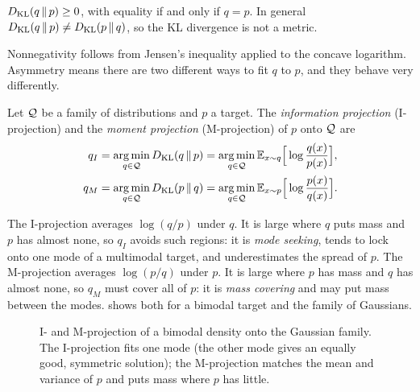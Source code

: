 \begin{proposition}\label{prop:kl-properties}
$D_{\mathrm{KL}}(q\,\|\,p)\ge0$, with equality if and only if $q=p$. In general $D_{\mathrm{KL}}(q\,\|\,p)\ne D_{\mathrm{KL}}(p\,\|\,q)$, so the KL divergence is not a metric.
\end{proposition}

Nonnegativity follows from Jensen's inequality applied to the concave logarithm. Asymmetry means there are two different ways to fit $q$ to $p$, and they behave very differently.

\begin{definition}\label{def:projections}
Let $\mathcal{Q}$ be a family of distributions and $p$ a target. The \emph{information projection} (I-projection) and the \emph{moment projection} (M-projection) of $p$ onto $\mathcal{Q}$ are
\begin{align*}
q_I&=\operatorname*{arg\,min}_{q\in\mathcal{Q}}D_{\mathrm{KL}}(q\,\|\,p)=\operatorname*{arg\,min}_{q\in\mathcal{Q}}\mathbb{E}_{x\sim q}\Big[\log\frac{q(x)}{p(x)}\Big],\\
q_M&=\operatorname*{arg\,min}_{q\in\mathcal{Q}}D_{\mathrm{KL}}(p\,\|\,q)=\operatorname*{arg\,min}_{q\in\mathcal{Q}}\mathbb{E}_{x\sim p}\Big[\log\frac{p(x)}{q(x)}\Big].
\end{align*}
\end{definition}

The I-projection averages $\log(q/p)$ under $q$. It is large where $q$ puts mass and $p$ has almost none, so $q_I$ avoids such regions: it is \emph{mode seeking}, tends to lock onto one mode of a multimodal target, and underestimates the spread of $p$. The M-projection averages $\log(p/q)$ under $p$. It is large where $p$ has mass and $q$ has almost none, so $q_M$ must cover all of $p$: it is \emph{mass covering} and may put mass between the modes.  shows both for a bimodal target and the family of Gaussians.

\begin{figure}[ht]
\centering
{}
\caption{I- and M-projection of a bimodal density onto the Gaussian family. The I-projection fits one mode (the other mode gives an equally good, symmetric solution); the M-projection matches the mean and variance of $p$ and puts mass where $p$ has little.}
\label{fig:projections}
\end{figure}


